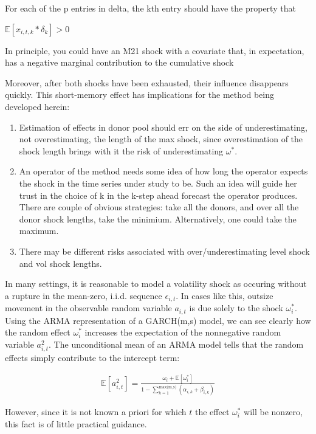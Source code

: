 \documentclass[11pt]{article}
\theoremstyle{definition}
\begin{document}
 For each of the p entries in delta, the kth entry should have the property that
 
 $\mathbb{E}[ x_{i,t,k} * \delta_{k} ] > 0$
 
 In principle, you could have an M21 shock with a covariate that, in expectation, has a negative marginal contribution to the cumulative shock

Moreover, after both shocks have been exhausted, their influence disappears quickly.  This short-memory effect has implications for the method being developed herein:

\begin{enumerate}
\item Estimation of effects in donor pool should err on the side of underestimating, not overestimating, the length of the max shock, since overestimation of the shock length brings with it the risk of underestimating $\omega^{*}$.
\item An operator of the method needs some idea of how long the operator expects the shock in the time series under study to be.  Such an idea will guide her trust in the choice of k in the k-step ahead forecast the operator produces.  There are couple of obvious strategies: take all the donors, and over all the donor shock lengths, take the minimium.  Alternatively, one could take the maximum.
\item There may be different risks associated with over/underestimating level shock and vol shock lengths.
\end{enumerate}



In many settings, it is reasonable to model a volatility shock as occuring without a rupture in the mean-zero, i.i.d. sequence $\epsilon_{i,t}$.  In cases like this, outsize movement in the observable random variable $a_{i,t}$ is due solely to the shock $\omega_{i}^{*}$.  Using the ARMA representation of a GARCH(m,s) model, we can see clearly how the random effect $\omega_{i}^{*}$ increases the expectation of the nonnegative random variable $a_{i,t}^{2}$.  The unconditional mean of an ARMA model tells that the random effects simply contribute to the intercept term:

\begin{align*} 
\mathbb{E}[a^{2}_{i,t}] = \frac{\omega_{i} + \mathbb{E}[\omega_{i}^{*}] }{1 - \sum^{\text{max(m,s)}}_{k=1}(\alpha_{i,k}+\beta_{i,k})}
\end{align*} 

However, since it is not known a priori for which $t$ the effect $\omega_{i}^{*}$ will be nonzero, this fact is of little practical guidance.
\end{document}
